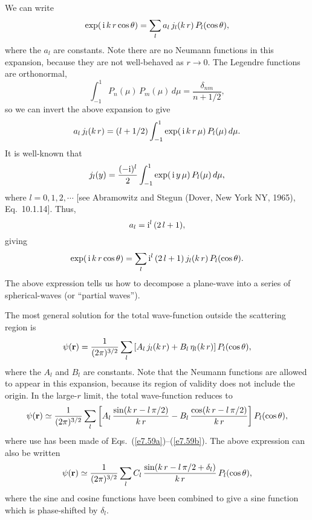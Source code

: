 We can write
\begin{equation}
\exp(\,{\rm i}\,k\,r \cos\theta) = \sum_l a_l\, j_l(k\,r)\, P_l(\cos\theta),
\end{equation}
where the $a_l$ are constants. Note there are no  Neumann functions in
this expansion, because they are not well-behaved  as $r \rightarrow 0$. 
The Legendre functions are orthonormal,
\begin{equation}\label{e7.61}
\int_{-1}^1 P_n(\mu) \,P_m(\mu)\,d\mu = \frac{\delta_{nm}}{n+1/2},
\end{equation}
so we can invert the above expansion to give
\begin{equation}
a_l \,j_l(k\,r) = (l+1/2)\int_{-1}^1 \exp(\,{\rm i}\,k\,r \,\mu) \,P_l(\mu) \,d\mu.
\end{equation}
It is well-known that
\begin{equation}
j_l(y) = \frac{(-{\rm i})^l}{2} \int_{-1}^1 \exp(\,{\rm i}\, y\,\mu)
\,P_l(\mu)\,d\mu,
\end{equation}
where $l=0, 1, 2, \cdots$ [see Abramowitz and Stegun (Dover, New York NY, 1965),
Eq.~10.1.14]. Thus,
\begin{equation}
a_l = {\rm i}^l \,(2\,l+1),
\end{equation}
giving
\begin{equation}
\exp(\,{\rm i}\,k\,r \cos\theta) = \sum_l {\rm i}^l\,
(2\,l+1)\, j_l(k\,r)\, P_l(\cos\theta).
\end{equation}
The above expression  tells us how to decompose
a plane-wave  into
a series of spherical-waves (or ``partial waves'').

The most general solution for the total wave-function outside the
scattering region is
\begin{equation}
\psi({\bf r}) = \frac{1}{(2\pi)^{3/2}} \sum_l\left[
A_l\,j_l(k\,r) + B_l\,\eta_l(k\,r)\right] P_l(\cos\theta),
\end{equation}
where the $A_l$ and $B_l$ are constants. 
Note that the Neumann functions are allowed to appear 
in this expansion, because
its region of validity does not include the origin. In the large-$r$
limit, the total wave-function reduces to
\begin{equation}
\psi ({\bf r} ) \simeq \frac{1}{(2\pi)^{3/2}} \sum_l\left[A_l\,
\frac{\sin(k\,r - l\,\pi/2)}{k\,r} - B_l\,\frac{\cos(k\,r -l\,\pi/2)}{k\,r}
\right] P_l(\cos\theta),
\end{equation}
where use has been made of Eqs.~(\ref{e7.59a})--(\ref{e7.59b}). The above expression can also
be written
\begin{equation}\label{e7.68}
\psi ({\bf r} ) \simeq \frac{1}{(2\pi)^{3/2}} \sum_l C_l\,
\frac{\sin(k\,r - l\,\pi/2+ \delta_l)}{k\,r}\, P_l(\cos\theta),
\end{equation}
where the sine and cosine functions have been combined to give a
sine function which is phase-shifted by $\delta_l$. 

